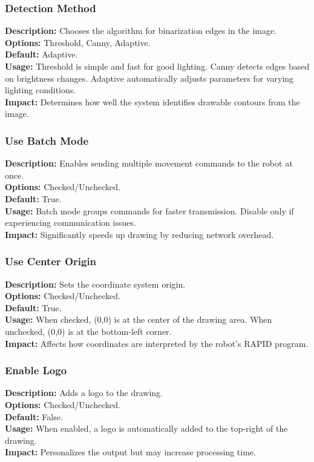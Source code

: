 \documentclass[a4paper,12pt]{article}
\begin{document}
\subsubsection{Detection Method}
\textbf{Description:} Chooses the algorithm for binarization edges in the image.\\
\textbf{Options:} Threshold, Canny, Adaptive.\\
\textbf{Default:} Adaptive.\\
\textbf{Usage:} Threshold is simple and fast for good lighting. Canny detects edges based on brightness changes. Adaptive automatically adjusts parameters for varying lighting conditions.\\
\textbf{Impact:} Determines how well the system identifies drawable contours from the image.

\subsubsection{Use Batch Mode}
\textbf{Description:} Enables sending multiple movement commands to the robot at once.\\
\textbf{Options:} Checked/Unchecked.\\
\textbf{Default:} True.\\
\textbf{Usage:} Batch mode groups commands for faster transmission. Disable only if experiencing communication issues.\\
\textbf{Impact:} Significantly speeds up drawing by reducing network overhead.

\subsubsection{Use Center Origin}
\textbf{Description:} Sets the coordinate system origin.\\
\textbf{Options:} Checked/Unchecked.\\
\textbf{Default:} True.\\
\textbf{Usage:} When checked, (0,0) is at the center of the drawing area. When unchecked, (0,0) is at the bottom-left corner.\\
\textbf{Impact:} Affects how coordinates are interpreted by the robot's RAPID program.

\subsubsection{Enable Logo}
\textbf{Description:} Adds a logo to the drawing.\\
\textbf{Options:} Checked/Unchecked.\\
\textbf{Default:} False.\\
\textbf{Usage:} When enabled, a logo is automatically added to the top-right of the drawing.\\
\textbf{Impact:} Personalizes the output but may increase processing time.
\end{document}
